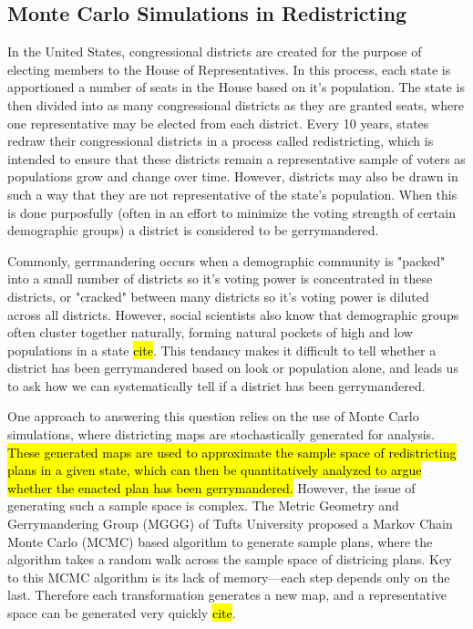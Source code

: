 \documentclass{article}
\begin{document}
\subsection{Monte Carlo Simulations in Redistricting}
\par 
In the United States, congressional districts are created for the purpose of electing members to the House of Representatives. In this process, each state is apportioned a number of seats in the House based on it's population. The state is then divided into as many congressional districts as they are granted seats, where one representative may be elected from each district. Every 10 years, states redraw their congressional districts in a process called redistricting, which is intended to ensure that these districts remain a representative sample of voters as populations grow and change over time. However, districts may also be drawn in such a way that they are not representative of the state's population. When this is done purposfully (often in an effort to minimize the voting strength of certain demographic groups) a district is considered to be gerrymandered.
\par
Commonly, gerrmandering occurs when a demographic community is "packed" into a small number of districts so it's voting power is concentrated in these districts, or "cracked" between many districts so it's voting power is diluted across all districts. However, social scientists also know that demographic groups often cluster together naturally, forming natural pockets of high and low populations in a state \hl{cite}. This tendancy makes it difficult to tell whether a district has been gerrymandered based on look or population alone, and leads us to ask how we can systematically tell if a district has been gerrymandered. 
\par
One approach to answering this question relies on the use of Monte Carlo simulations, where districting maps are stochastically generated for analysis. \hl{These generated maps are used to approximate the sample space of redistricting plans in a given state, which can then be quantitatively analyzed to argue whether the enacted plan has been gerrymandered.} However, the issue of generating such a sample space is complex. The Metric Geometry and Gerrymandering Group (MGGG) of Tufts University proposed a Markov Chain Monte Carlo (MCMC) based algorithm to generate sample plans, where the algorithm takes a random walk across the sample space of districing plans. Key to this MCMC algorithm is its lack of memory—each step depends only on the last. Therefore each transformation generates a new map, and a representative space can be generated very quickly \hl{cite}. 
\end{document}
